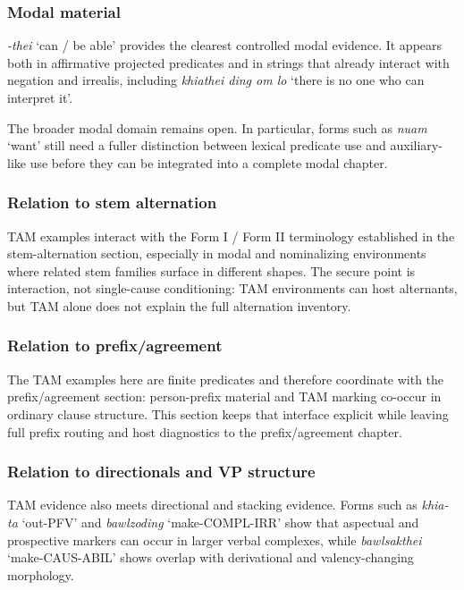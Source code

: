 \documentclass[
  11pt,
  a4paper,
]{article}
\newcommand{\tdim}[1]{\textit{#1}}
\newcommand{\glossquote}[1]{`#1'}
\begin{document}
\subsubsection{Modal material}\label{modal-material}

\tdim{-thei} \glossquote{can / be able} provides the clearest controlled
modal evidence. It appears both in affirmative projected predicates and
in strings that already interact with negation and irrealis, including
\tdim{khiathei ding om lo}
\glossquote{there is no one who can interpret it}.

The broader modal domain remains open. In particular, forms such as
\tdim{nuam} \glossquote{want} still need a fuller distinction between
lexical predicate use and auxiliary-like use before they can be
integrated into a complete modal chapter.

\subsubsection{Relation to stem
alternation}\label{relation-to-stem-alternation}

TAM examples interact with the Form I / Form II terminology established
in the stem-alternation section, especially in modal and nominalizing
environments where related stem families surface in different shapes.
The secure point is interaction, not single-cause conditioning: TAM
environments can host alternants, but TAM alone does not explain the
full alternation inventory.

\subsubsection{Relation to
prefix/agreement}\label{relation-to-prefixagreement-1}

The TAM examples here are finite predicates and therefore coordinate
with the prefix/agreement section: person-prefix material and TAM
marking co-occur in ordinary clause structure. This section keeps that
interface explicit while leaving full prefix routing and host
diagnostics to the prefix/agreement chapter.

\subsubsection{Relation to directionals and VP
structure}\label{relation-to-directionals-and-vp-structure}

TAM evidence also meets directional and stacking evidence. Forms such as
\tdim{khia-ta} \glossquote{out-PFV} and \tdim{bawlzoding}
\glossquote{make-COMPL-IRR} show that aspectual and prospective markers
can occur in larger verbal complexes, while \tdim{bawlsakthei}
\glossquote{make-CAUS-ABIL} shows overlap with derivational and
valency-changing morphology.
\end{document}
